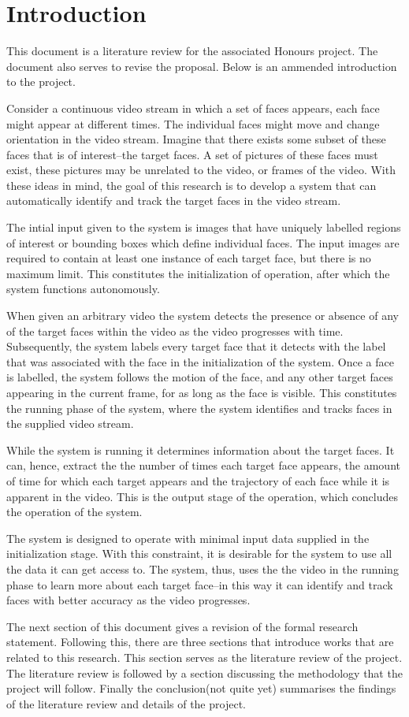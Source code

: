 \section{Introduction}
  This document is a literature review for the associated Honours project.
  The document also serves to revise the proposal.
  Below is an ammended introduction to the project.

  Consider a continuous video stream in which a set of faces appears, each face might appear at different times.
  The individual faces might move and change orientation in the video stream.
  Imagine that there exists some subset of these faces that is of interest--the target faces.
  A set of pictures of these faces must exist, these pictures may be unrelated to the video, or frames of the video.
  With these ideas in mind, the goal of this research is to develop a system that can automatically identify and track the target faces in the video stream.

  The intial input given to the system is images that have uniquely labelled regions of interest or bounding boxes which define individual faces.
  The input images are required to contain at least one instance of each target face, but there is no maximum limit.
  This constitutes the initialization of operation, after which the system functions autonomously.

  When given an arbitrary video the system detects the presence or absence of any of the target faces within the video as the video progresses with time.
  Subsequently, the system labels every target face that it detects with the label that was associated with the face in the initialization of the system.
  Once a face is labelled, the system follows the motion of the face, and any other target faces appearing in the current frame, for as long as the face is visible.
  This constitutes the running phase of the system, where the system identifies and tracks faces in the supplied video stream.

  While the system is running it determines information about the target faces.
  It can, hence, extract the the number of times each target face appears, the amount of time for which each target appears and the trajectory of each face while it is apparent in the video.
  This is the output stage of the operation, which concludes the operation of the system.

  The system is designed to operate with minimal input data supplied in the initialization stage.
  With this constraint, it is desirable for the system to use all the data it can get access to. 
  The system, thus, uses the the video in the running phase to learn more about each target face--in this way it can identify and track faces with better accuracy as the video progresses.

  The next section of this document gives a revision of the formal research statement.
  Following this, there are three sections that introduce works that are related to this research.
  This section serves as the literature review of the project. 
  The literature review is followed by a section discussing the methodology that the project will follow.
  Finally the conclusion(not quite yet) summarises the findings of the literature review and details of the project.
